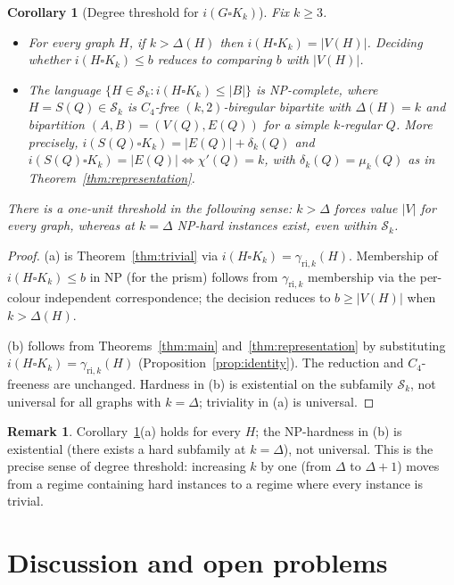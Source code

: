 \documentclass[11pt,a4paper]{article}
\theoremstyle{plain}
\newtheorem{corollary}[theorem]{Corollary}
\theoremstyle{definition}
\newtheorem{remark}[theorem]{Remark}
\newcommand{\gri}{\gamma_{\mathrm{ri},k}}
\newcommand{\cardK}{\square K_k}
\newcommand{\cS}{\mathcal{S}}
\begin{document}
\begin{corollary}[Degree threshold for $i(G\cardK)$]\label{cor:threshold}
Fix $k\ge 3$.
\begin{itemize}
\item[(a) Universal regime $k>\Delta(H)$:] For every graph $H$, if $k>\Delta(H)$ then $i(H\cardK)=|V(H)|$. Deciding whether $i(H\cardK)\le b$ reduces to comparing $b$ with $|V(H)|$.
\item[(b) Boundary regime $k=\Delta(H)$:] The language $\{H\in\cS_{k}: i(H\cardK)\le|B|\}$ is NP-complete, where $H=S(Q)\in\cS_{k}$ is $C_{4}$-free $(k,2)$-biregular bipartite with $\Delta(H)=k$ and bipartition $(A,B)=(V(Q),E(Q))$ for a simple $k$-regular $Q$. More precisely, $i(S(Q)\cardK)=|E(Q)|+\delta_{k}(Q)$ and $i(S(Q)\cardK)=|E(Q)|\iff\chi'(Q)=k$, with $\delta_{k}(Q)=\mu_{k}(Q)$ as in Theorem~\ref{thm:representation}.
\end{itemize}
There is a one-unit threshold in the following sense: $k>\Delta$ forces value $|V|$ for every graph, whereas at $k=\Delta$ NP-hard instances exist, even within $\cS_{k}$.
\end{corollary}
\begin{proof}
(a) is Theorem~\ref{thm:trivial} via $i(H\cardK)=\gri(H)$. Membership of $i(H\cardK)\le b$ in NP (for the prism) follows from $\gri$ membership via the per-colour independent correspondence; the decision reduces to $b\ge|V(H)|$ when $k>\Delta(H)$.

(b) follows from Theorems~\ref{thm:main} and~\ref{thm:representation} by substituting $i(H\cardK)=\gri(H)$ (Proposition~\ref{prop:identity}). The reduction and $C_{4}$-freeness are unchanged. Hardness in (b) is existential on the subfamily $\cS_{k}$, not universal for all graphs with $k=\Delta$; triviality in (a) is universal.
\end{proof}

\begin{remark}
Corollary~\ref{cor:threshold}(a) holds for every $H$; the NP-hardness in (b) is existential (there exists a hard subfamily at $k=\Delta$), not universal. This is the precise sense of degree threshold: increasing $k$ by one (from $\Delta$ to $\Delta+1$) moves from a regime containing hard instances to a regime where every instance is trivial.
\end{remark}

\section{Discussion and open problems}\label{sec:discussion}
\end{document}
